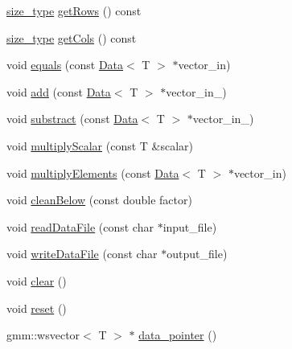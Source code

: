 \begin{DoxyCompactItemize}
\item 
\hyperlink{lmx__mat__data_8h_a49b489a408a211a90e766329c0732d7b}{size\-\_\-type} \hyperlink{classlmx_1_1Type__gmmVector__sparse_a6998599dcc3097907717f5d7616f4ae3}{get\-Rows} () const 
\item 
\hyperlink{lmx__mat__data_8h_a49b489a408a211a90e766329c0732d7b}{size\-\_\-type} \hyperlink{classlmx_1_1Type__gmmVector__sparse_aac929b84c92b84e9d9ed7476ca2d24a2}{get\-Cols} () const 
\item 
void \hyperlink{classlmx_1_1Type__gmmVector__sparse_ad40a2793840d2053fce15b017524e4d7}{equals} (const \hyperlink{classlmx_1_1Data}{Data}$<$ T $>$ $\ast$vector\-\_\-in)
\item 
void \hyperlink{classlmx_1_1Type__gmmVector__sparse_ac309aa177fd30def4598b3f19884a397}{add} (const \hyperlink{classlmx_1_1Data}{Data}$<$ T $>$ $\ast$vector\-\_\-in\-\_)
\item 
void \hyperlink{classlmx_1_1Type__gmmVector__sparse_a9f916d35ddafd3328d6c1a75372b3e2a}{substract} (const \hyperlink{classlmx_1_1Data}{Data}$<$ T $>$ $\ast$vector\-\_\-in\-\_)
\item 
void \hyperlink{classlmx_1_1Type__gmmVector__sparse_ad6a694c0ff2c910c2c34b02ba6455450}{multiply\-Scalar} (const T \&scalar)
\item 
void \hyperlink{classlmx_1_1Type__gmmVector__sparse_ad122828c2ec742370534f19f5b86ee88}{multiply\-Elements} (const \hyperlink{classlmx_1_1Data}{Data}$<$ T $>$ $\ast$vector\-\_\-in)
\item 
void \hyperlink{classlmx_1_1Type__gmmVector__sparse_a6f9b445388c349959ecbf7c89b2b120c}{clean\-Below} (const double factor)
\item 
void \hyperlink{classlmx_1_1Type__gmmVector__sparse_a8cdbdf44a2366bf9233fbee879e72e6e}{read\-Data\-File} (const char $\ast$input\-\_\-file)
\item 
void \hyperlink{classlmx_1_1Type__gmmVector__sparse_a73766d175f2014fbe6d4497b1856edec}{write\-Data\-File} (const char $\ast$output\-\_\-file)
\item 
void \hyperlink{classlmx_1_1Type__gmmVector__sparse_a12581391ae3eece7b87ebebfdaa59e9d}{clear} ()
\item 
void \hyperlink{classlmx_1_1Type__gmmVector__sparse_a9c5345694e2e77e88858a773c69983b9}{reset} ()
\item 
gmm\-::wsvector$<$ T $>$ $\ast$ \hyperlink{classlmx_1_1Type__gmmVector__sparse_a377f0060298ceebdfbf91755b9532a91}{data\-\_\-pointer} ()
\end{DoxyCompactItemize}


